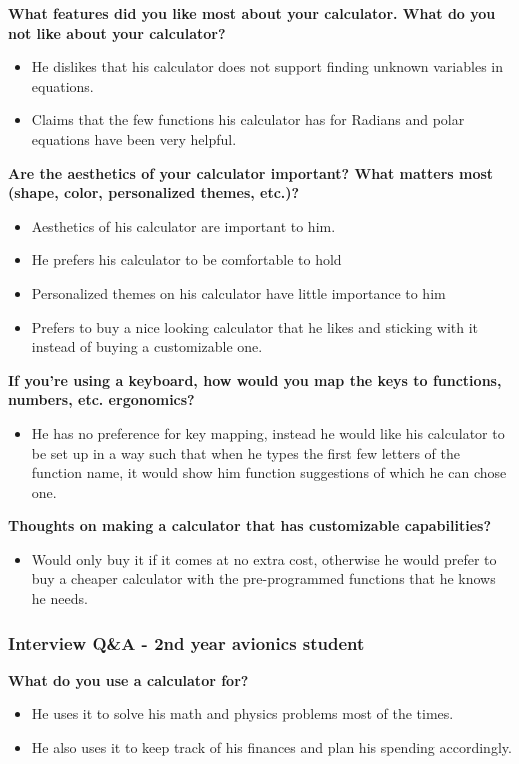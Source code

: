 \documentclass[a4paper]{article}
\begin{document}
\textbf{What features did you like most about your calculator. What do you not like about your calculator?}
\begin{itemize}
\itemsep0em 
\item He dislikes that his calculator does not support finding unknown variables in equations.
\item Claims that the few functions his calculator has for Radians and polar equations have been very helpful.
\end{itemize}

\textbf{Are the aesthetics of your calculator important? What matters most (shape, color,  personalized themes, etc.)?}
\begin{itemize}
\itemsep0em 
\item Aesthetics of his calculator are important to him.
\item He prefers his calculator to be comfortable to hold 
\item Personalized themes on his calculator have little importance to him
\item Prefers to buy a nice looking calculator that he likes and sticking with it instead of buying a customizable one.
\end{itemize}

\textbf{If you’re using a keyboard, how would you map the keys to functions, numbers, etc. ergonomics?}
\begin{itemize}
\itemsep0em 
\item He has no preference for key mapping, instead he would like his calculator to be set up in a way such that when he types the first few letters of the function name, it would show him function suggestions of which he can chose one.
\end{itemize}

\textbf{Thoughts on making a calculator that has customizable capabilities? }
\begin{itemize}
\itemsep0em 
\item Would only buy it if it comes at no extra cost, otherwise he would prefer to buy a cheaper calculator with the pre-programmed functions that he knows he needs.
\end{itemize}
\pagebreak



\subsubsection*{Interview Q\&A - 2nd year avionics student}
\textbf{What do you use a calculator for?}
\begin{itemize}
\itemsep0em 
\item He uses it to solve his math and physics problems most of the times. 
\item He also uses it to keep track of his finances and plan his spending accordingly.
\end{itemize}
\end{document}
